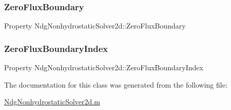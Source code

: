 \subsubsection{\texorpdfstring{Zero\+Flux\+Boundary}{ZeroFluxBoundary}}
{\footnotesize\ttfamily Property Ndg\+Nonhydrostatic\+Solver2d\+::\+Zero\+Flux\+Boundary}

\mbox{\label{class_ndg_nonhydrostatic_solver2d_adeb35a9403549b9a0161daabb0ec450d}} 
\subsubsection{\texorpdfstring{Zero\+Flux\+Boundary\+Index}{ZeroFluxBoundaryIndex}}
{\footnotesize\ttfamily Property Ndg\+Nonhydrostatic\+Solver2d\+::\+Zero\+Flux\+Boundary\+Index}



The documentation for this class was generated from the following file\+:\begin{DoxyCompactItemize}
\item 
\hyperlink{_ndg_nonhydrostatic_solver2d_8m}{Ndg\+Nonhydrostatic\+Solver2d.\+m}\end{DoxyCompactItemize}
